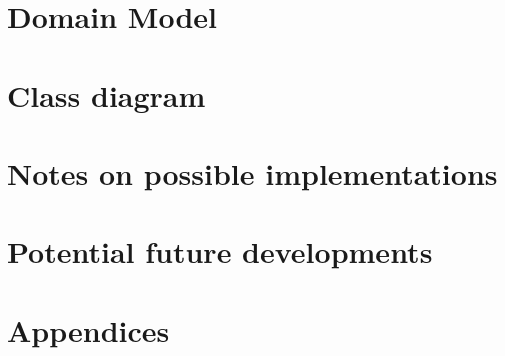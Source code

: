 \documentclass[11pt]{article}
\begin{document}
\section{Domain Model}

\newpage

\section{Class diagram}


\section{Notes on possible implementations}

\section{Potential future developments}

\section{Appendices}

\end{document}
